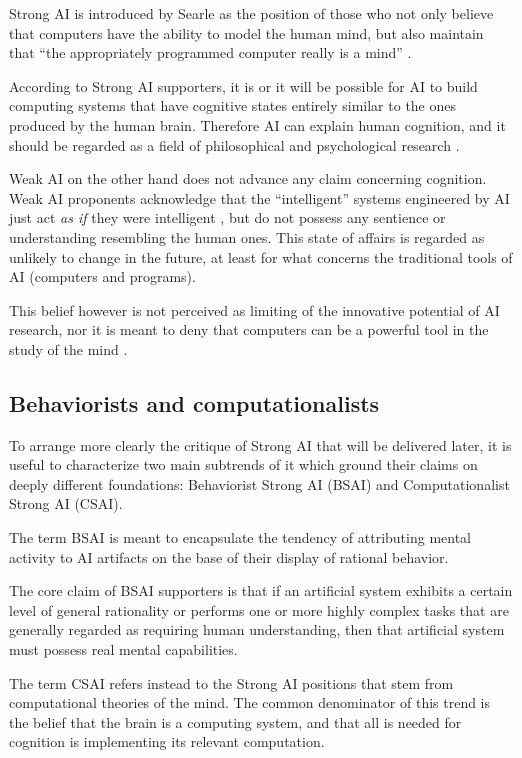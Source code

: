 \documentclass{article}
\begin{document}
Strong AI is introduced by Searle as the position of those who not only believe that computers have the ability to model the human mind, but also maintain that ``the appropriately programmed computer really is a mind'' \citep[417]{searle1980minds}.

According to Strong AI supporters, it is or it will be possible for AI to build computing systems that have cognitive states entirely similar to the ones produced by the human brain. Therefore AI can explain human cognition, and it should be regarded as a field of philosophical and psychological research \citep{dennett1978artificial}.

Weak AI on the other hand does not advance any claim concerning cognition. Weak AI proponents acknowledge that the ``intelligent'' systems engineered by AI just act \textit{as if} they were intelligent \citep{russell2016artificial}, but do not possess any sentience or understanding resembling the human ones.  This state of affairs is regarded as unlikely to change in the future, at least for what concerns the traditional tools of AI (computers and programs).

This belief however is not perceived as limiting of the innovative potential of AI research, nor it is meant to deny that computers can be a powerful tool in the study of the mind \citep{searle1980minds}.

\subsection{Behaviorists and computationalists}

To arrange more clearly the critique of Strong AI that will be delivered later, it is useful to characterize two main subtrends of it which ground their claims on deeply different foundations: Behaviorist Strong AI (BSAI) and Computationalist Strong AI (CSAI).

The term BSAI is meant to encapsulate the tendency of attributing mental activity to AI artifacts on the base of their display of rational behavior.

The core claim of BSAI supporters is that if an artificial system exhibits a certain level of general rationality or performs one or more highly complex tasks that are generally regarded as requiring human understanding, then that artificial system must possess real mental capabilities.

The term CSAI refers instead to the Strong AI positions that stem from computational theories of the mind. The common denominator of this trend is the belief that the brain is a computing system, and that all is needed for cognition is implementing its relevant computation.
\end{document}
